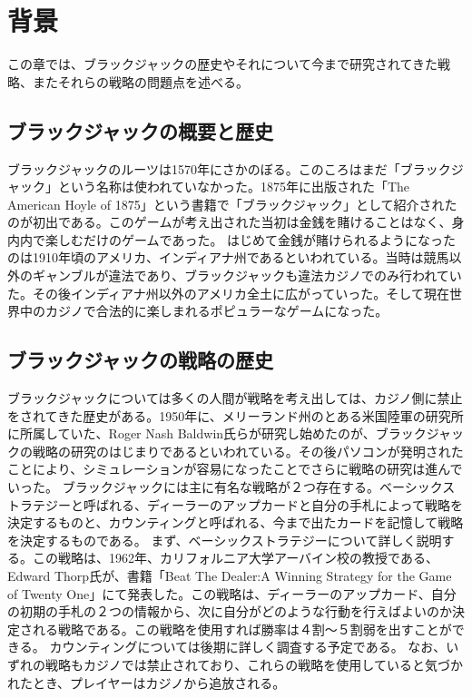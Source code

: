 \section{背景}
この章では、ブラックジャックの歴史やそれについて今まで研究されてきた戦略、またそれらの戦略の問題点を述べる。

\subsection{ブラックジャックの概要と歴史}
ブラックジャックのルーツは1570年にさかのぼる。このころはまだ「ブラックジャック」という名称は使われていなかった。1875年に出版された「The American Hoyle of 1875」という書籍で「ブラックジャック」として紹介されたのが初出である。このゲームが考え出された当初は金銭を賭けることはなく、身内内で楽しむだけのゲームであった。
はじめて金銭が賭けられるようになったのは1910年頃のアメリカ、インディアナ州であるといわれている。当時は競馬以外のギャンブルが違法であり、ブラックジャックも違法カジノでのみ行われていた。その後インディアナ州以外のアメリカ全土に広がっていった。そして現在世界中のカジノで合法的に楽しまれるポピュラーなゲームになった。

\subsection{ブラックジャックの戦略の歴史}
ブラックジャックについては多くの人間が戦略を考え出しては、カジノ側に禁止をされてきた歴史がある。1950年に、メリーランド州のとある米国陸軍の研究所に所属していた、Roger Nash Baldwin氏らが研究し始めたのが、ブラックジャックの戦略の研究のはじまりであるといわれている。その後パソコンが発明されたことにより、シミュレーションが容易になったことでさらに戦略の研究は進んでいった。
ブラックジャックには主に有名な戦略が２つ存在する。ベーシックストラテジーと呼ばれる、ディーラーのアップカードと自分の手札によって戦略を決定するものと、カウンティングと呼ばれる、今まで出たカードを記憶して戦略を決定するものである。
まず、ベーシックストラテジーについて詳しく説明する。この戦略は、1962年、カリフォルニア大学アーバイン校の教授である、Edward Thorp氏が、書籍「Beat The Dealer:A Winning Strategy for the Game of Twenty One」にて発表した。この戦略は、ディーラーのアップカード、自分の初期の手札の２つの情報から、次に自分がどのような行動を行えばよいのか決定される戦略である。この戦略を使用すれば勝率は４割～５割弱を出すことができる。
カウンティングについては後期に詳しく調査する予定である。
なお、いずれの戦略もカジノでは禁止されており、これらの戦略を使用していると気づかれたとき、プレイヤーはカジノから追放される。

